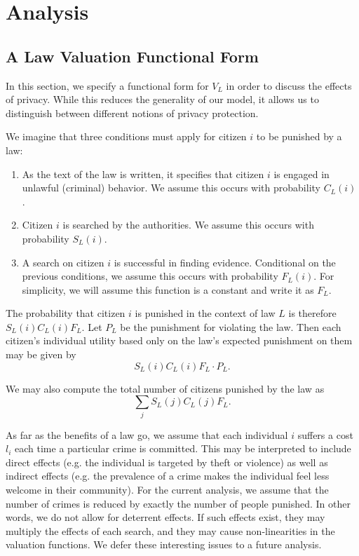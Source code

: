 
\section{Analysis}
\label{sec:analysis}



\subsection{A Law Valuation Functional Form}
In this section, we specify a functional form for $V_L$ in order to discuss the effects of privacy.  While this reduces the generality of our model, it allows us to distinguish between different notions of privacy protection.  

We imagine that three conditions must apply for citizen $i$ to be punished by a law:

\begin{enumerate}
\item As the text of the law is written, it specifies that citizen $i$ is engaged in unlawful (criminal) behavior.  We assume this occurs with probability $C_L(i)$.
\item Citizen $i$ is searched by the authorities.  We assume this occurs with probability $S_L(i)$.
\item A search on citizen $i$ is successful in finding evidence.  Conditional on the previous conditions, we assume this occurs with probability $F_L(i)$.  For simplicity, we will assume this function is a constant and write it as $F_L$.
\end{enumerate}

The probability that citizen $i$ is punished in the context of law $L$ is therefore $S_L(i)C_L(i)F_L$. 
Let $P_L$ be the punishment for violating the law. Then each citizen's individual utility based only on the law's expected punishment on them may be given by 
$$S_L(i)C_L(i)F_L\cdot P_L.$$

We may also compute the total number of citizens punished by the law as $$\sum_j S_L(j)C_L(j)F_L.$$  

As far as the benefits of a law go, we assume that each individual $i$ suffers a cost $l_i$ each time a particular crime is committed.  This may be interpreted to include direct effects (e.g. the individual is targeted by theft or violence) as well as indirect effects (e.g. the prevalence of a crime makes the individual feel less welcome in their community).  For the current analysis, we assume that the number of crimes is reduced by exactly the number of people punished.  In other words, we do not allow for deterrent effects.  If such effects exist, they may multiply the effects of each search, and they may cause non-linearities in the valuation functions.  We defer these interesting issues to a future analysis.

